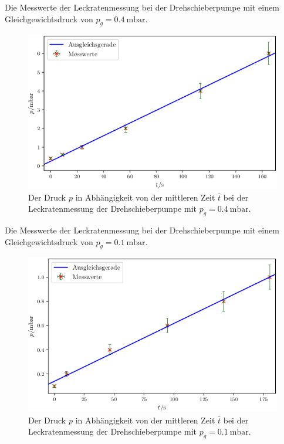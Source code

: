 \begin{table}
\centering
\caption{Die Messwerte der Leckratenmessung bei der Drehschieberpumpe mit einem Gleichgewichtsdruck von $p_g = \SI{0.4}{\milli\bar}$.}

\label{tab:DL3}
\end{table}

\begin{figure}
\centering
\includegraphics[width=\linewidth-70pt,height=\textheight-70pt,keepaspectratio]{content/images/DL3.png}
\caption{Der Druck $p$ in Abhängigkeit von der mittleren Zeit $\bar{t}$ bei der Leckratenmessung der Drehschieberpumpe  mit $p_g = \SI{0.4}{\milli\bar}$.}
\label{fig:DL3}
\end{figure}

\begin{table}
\centering
\caption{Die Messwerte der Leckratenmessung bei der Drehschieberpumpe mit einem Gleichgewichtsdruck von $p_g = \SI{0.1}{\milli\bar}$.}

\label{tab:DL4}
\end{table}

\begin{figure}
\centering
\includegraphics[width=\linewidth-70pt,height=\textheight-70pt,keepaspectratio]{content/images/DL4.png}
\caption{Der Druck $p$ in Abhängigkeit von der mittleren Zeit $\bar{t}$ bei der Leckratenmessung der Drehschieberpumpe  mit $p_g = \SI{0.1}{\milli\bar}$.}
\label{fig:DL4}
\end{figure}

